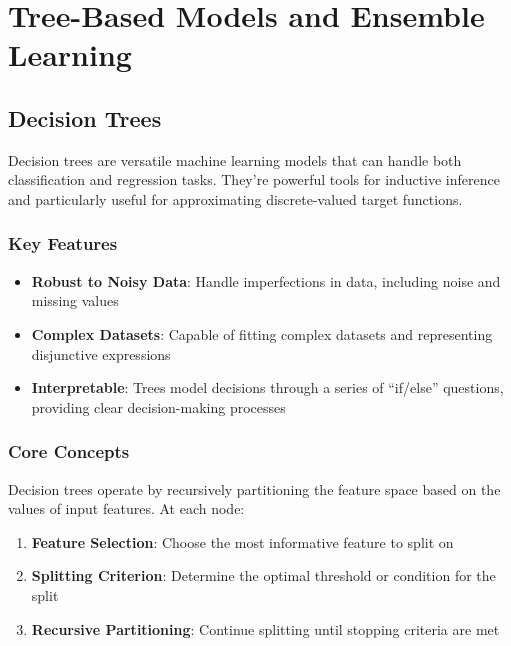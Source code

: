 \documentclass[
  letterpaper,
  DIV=11,
  numbers=noendperiod]{scrreprt}
\providecommand{\tightlist}{%
  \setlength{\itemsep}{0pt}\setlength{\parskip}{0pt}}\usepackage{longtable,booktabs,array}
\begin{document}

\chapter{Tree-Based Models and Ensemble
Learning}\label{tree-based-models-and-ensemble-learning}

\section{Decision Trees}\label{decision-trees}

Decision trees are versatile machine learning models that can handle
both classification and regression tasks. They're powerful tools for
inductive inference and particularly useful for approximating
discrete-valued target functions.

\subsection{Key Features}\label{key-features}

\begin{itemize}
\tightlist
\item
  \textbf{Robust to Noisy Data}: Handle imperfections in data, including
  noise and missing values
\item
  \textbf{Complex Datasets}: Capable of fitting complex datasets and
  representing disjunctive expressions
\item
  \textbf{Interpretable}: Trees model decisions through a series of
  ``if/else'' questions, providing clear decision-making processes
\end{itemize}

\subsection{Core Concepts}\label{core-concepts}

Decision trees operate by recursively partitioning the feature space
based on the values of input features. At each node:

\begin{enumerate}
\def\labelenumi{\arabic{enumi}.}
\tightlist
\item
  \textbf{Feature Selection}: Choose the most informative feature to
  split on
\item
  \textbf{Splitting Criterion}: Determine the optimal threshold or
  condition for the split
\item
  \textbf{Recursive Partitioning}: Continue splitting until stopping
  criteria are met
\end{enumerate}
\end{document}
